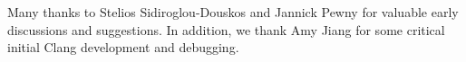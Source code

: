 

Many thanks to Stelios Sidiroglou-Douskos and Jannick Pewny for valuable early discussions and suggestions.  
In addition, we thank Amy Jiang for some critical initial Clang development and debugging.
